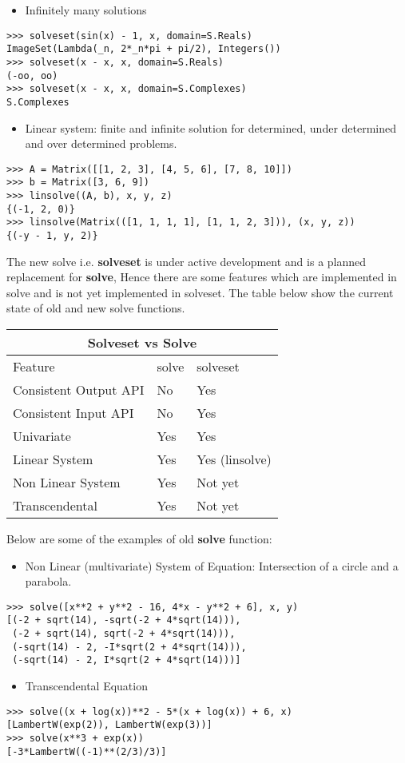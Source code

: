 \begin{itemize}
\item Infinitely many solutions
\end{itemize}
\begin{verbatim}
>>> solveset(sin(x) - 1, x, domain=S.Reals)
ImageSet(Lambda(_n, 2*_n*pi + pi/2), Integers())
>>> solveset(x - x, x, domain=S.Reals)
(-oo, oo)
>>> solveset(x - x, x, domain=S.Complexes)
S.Complexes
\end{verbatim}

\begin{itemize}
\item Linear system: finite and infinite solution for determined, under
determined and over determined problems.
\end{itemize}
\begin{verbatim}
>>> A = Matrix([[1, 2, 3], [4, 5, 6], [7, 8, 10]])
>>> b = Matrix([3, 6, 9])
>>> linsolve((A, b), x, y, z)
{(-1, 2, 0)}
>>> linsolve(Matrix(([1, 1, 1, 1], [1, 1, 2, 3])), (x, y, z))
{(-y - 1, y, 2)}
\end{verbatim}

The new solve i.e. \textbf{solveset} is under active development and is a
planned replacement for \textbf{solve}, Hence there are some features which are
implemented in solve and is not yet implemented in solveset. The table below
show the current state of old and new solve functions.

\hfill

\begin{tabular}{ |p{4cm}|p{3cm}|p{3cm}|  }
\hline
\multicolumn{3}{|c|}{Solveset vs Solve} \\
\hline
Feature& solve &solveset \\
\hline
Consistent Output API & No & Yes \\
Consistent Input API & No & Yes \\
Univariate & Yes & Yes\\
Linear System& Yes & Yes (linsolve) \\
Non Linear System& Yes & Not yet \\
Transcendental& Yes & Not yet \\
\hline
\end{tabular}

\hfill \break{}

Below are some of the examples of old \textbf{solve} function:

\begin{itemize}
\item Non Linear (multivariate) System of Equation: Intersection of a circle
and a parabola.
\end{itemize}
\begin{verbatim}
>>> solve([x**2 + y**2 - 16, 4*x - y**2 + 6], x, y)
[(-2 + sqrt(14), -sqrt(-2 + 4*sqrt(14))),
 (-2 + sqrt(14), sqrt(-2 + 4*sqrt(14))),
 (-sqrt(14) - 2, -I*sqrt(2 + 4*sqrt(14))),
 (-sqrt(14) - 2, I*sqrt(2 + 4*sqrt(14)))]
\end{verbatim}

\begin{itemize}
\item Transcendental Equation
\end{itemize}
\begin{verbatim}
>>> solve((x + log(x))**2 - 5*(x + log(x)) + 6, x)
[LambertW(exp(2)), LambertW(exp(3))]
>>> solve(x**3 + exp(x))
[-3*LambertW((-1)**(2/3)/3)]
\end{verbatim}
